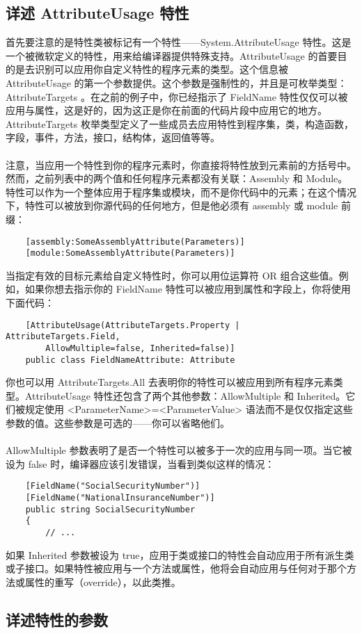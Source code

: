 \subsection{详述 AttributeUsage 特性}
首先要注意的是特性类被标记有一个特性——System.AttributeUsage 特性。这是一个被微软定义的特性，用来给编译器提供特殊支持。AttributeUsage 的首要目的是去识别可以应用你自定义特性的程序元素的类型。这个信息被 AttributeUsage 的第一个参数提供。这个参数是强制性的，并且是可枚举类型：AttributeTargets 。在之前的例子中，你已经指示了 FieldName 特性仅仅可以被应用与属性，这是好的，因为这正是你在前面的代码片段中应用它的地方。AttributeTargets 枚举类型定义了一些成员去应用特性到程序集，类，构造函数，字段，事件，方法，接口，结构体，返回值等等。
\\ \\
注意，当应用一个特性到你的程序元素时，你直接将特性放到元素前的方括号中。然而，之前列表中的两个值和任何程序元素都没有关联：Assembly 和 Module。特性可以作为一个整体应用于程序集或模块，而不是你代码中的元素；在这个情况下，特性可以被放到你源代码的任何地方，但是他必须有 assembly 或 module 前缀：
\begin{verbatim}
    [assembly:SomeAssemblyAttribute(Parameters)]
    [module:SomeAssemblyAttribute(Parameters)]
\end{verbatim}
当指定有效的目标元素给自定义特性时，你可以用位运算符 OR 组合这些值。例如，如果你想去指示你的 FieldName 特性可以被应用到属性和字段上，你将使用下面代码：
\begin{verbatim}
    [AttributeUsage(AttributeTargets.Property | AttributeTargets.Field,
        AllowMultiple=false, Inherited=false)]
    public class FieldNameAttribute: Attribute
\end{verbatim}
你也可以用 AttributeTargets.All 去表明你的特性可以被应用到所有程序元素类型。AttributeUsage 特性还包含了两个其他参数：AllowMultiple 和 Inherited。它们被规定使用 <ParameterName>=<ParameterValue> 语法而不是仅仅指定这些参数的值。这些参数是可选的——你可以省略他们。
\\ \\
AllowMultiple 参数表明了是否一个特性可以被多于一次的应用与同一项。当它被设为 false 时，编译器应该引发错误，当看到类似这样的情况：
\begin{verbatim}
    [FieldName("SocialSecurityNumber")]
    [FieldName("NationalInsuranceNumber")]
    public string SocialSecurityNumber
    {
        // ...
\end{verbatim}
如果 Inherited 参数被设为 true，应用于类或接口的特性会自动应用于所有派生类或子接口。如果特性被应用与一个方法或属性，他将会自动应用与任何对于那个方法或属性的重写（override），以此类推。

\subsection{详述特性的参数}